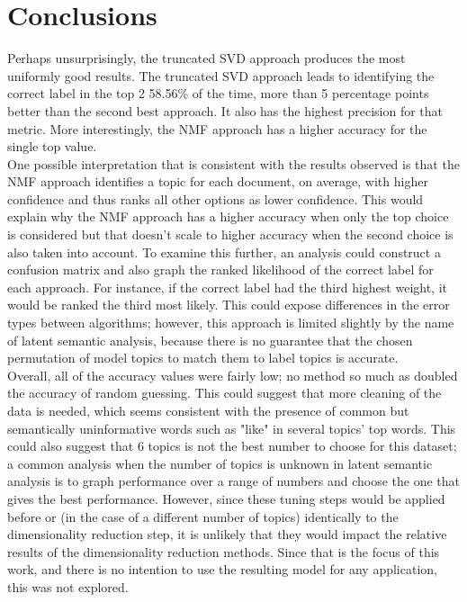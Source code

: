 \documentclass{article}
\begin{document}
\section{Conclusions}

Perhaps unsurprisingly, the truncated SVD approach produces the most uniformly good results. The truncated SVD approach leads to identifying the correct label in the top 2 58.56\% of the time, more than 5 percentage points better than the second best approach. It also has the highest precision for that metric. More interestingly, the NMF approach has a higher accuracy for the single top value. \\

One possible interpretation that is consistent with the results observed is that the NMF approach identifies a topic for each document, on average, with higher confidence and thus ranks all other options as lower confidence. This would explain why the NMF approach has a higher accuracy when only the top choice is considered but that doesn't scale to higher accuracy when the second choice is also taken into account. To examine this further, an analysis could construct a confusion matrix and also graph the ranked likelihood of the correct label for each approach. For instance, if the correct label had the third highest weight, it would be ranked the third most likely. This could expose differences in the error types between algorithms; however, this approach is limited slightly by the name of latent semantic analysis, because there is no guarantee that the chosen permutation of model topics to match them to label topics is accurate. \\

Overall, all of the accuracy values were fairly low; no method so much as doubled the accuracy of random guessing. This could suggest that more cleaning of the data is needed, which seems consistent with the presence of common but semantically uninformative words such as "like" in several topics' top words. This could also suggest that 6 topics is not the best number to choose for this dataset; a common analysis when the number of topics is unknown in latent semantic analysis is to graph performance over a range of numbers and choose the one that gives the best performance. However, since these tuning steps would be applied before or (in the case of a different number of topics) identically to the dimensionality reduction step, it is unlikely that they would impact the relative results of the dimensionality reduction methods. Since that is the focus of this work, and there is no intention to use the resulting model for any application, this was not explored. \\
\end{document}
